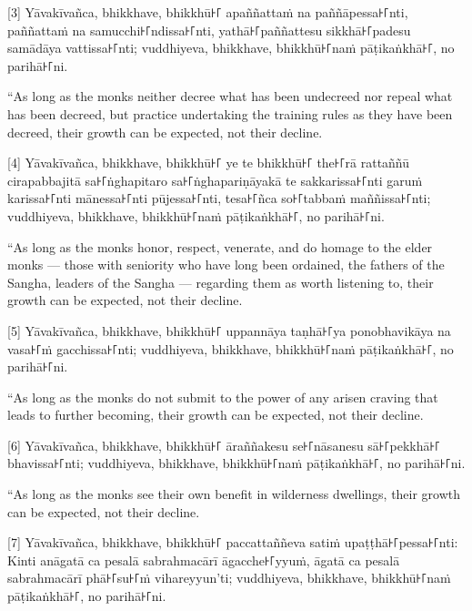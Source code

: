 \documentclass[
  babelLanguage=portuguese,
  final,
  a4Paper,
]{chantingbook}
\begin{document}
[3] Yāvakīvañca, bhikkhave, bhikkhū꜔꜒ apaññattaṁ na paññāpessa꜔꜒nti, paññattaṁ na
samucchi꜔꜒ndissa꜔꜒nti, yathā꜔꜒paññattesu sikkhā꜔꜒padesu samādāya vattissa꜔꜒nti;
vuddhiyeva, bhikkhave, bhikkhū꜔꜒naṁ pāṭikaṅkhā꜔꜒, no parihā꜔꜒ni.

\begin{english}
  “As long as the monks neither decree what has been undecreed nor repeal what
  has been decreed, but practice undertaking the training rules as they have
  been decreed, their growth can be expected, not their decline.
\end{english}

[4] Yāvakīvañca, bhikkhave, bhikkhū꜔꜒ ye te bhikkhū꜔꜒ the꜔꜒rā rattaññū cirapabbajitā
sa꜔꜒ṅghapitaro sa꜔꜒ṅghapariṇāyakā te sakkarissa꜔꜒nti garuṁ karissa꜔꜒nti mānessa꜔꜒nti
pūjessa꜔꜒nti, tesa꜔꜒ñca so꜔꜒tabbaṁ maññissa꜔꜒nti; vuddhiyeva, bhikkhave, bhikkhū꜔꜒naṁ
pāṭikaṅkhā꜔꜒, no parihā꜔꜒ni.

\begin{english}
  “As long as the monks honor, respect, venerate, and do homage to the elder
  monks — those with seniority who have long been ordained, the fathers of the
  Sangha, leaders of the Sangha — regarding them as worth listening to, their
  growth can be expected, not their decline.
\end{english}

[5] Yāvakīvañca, bhikkhave, bhikkhū꜔꜒ uppannāya taṇhā꜔꜒ya ponobhavikāya na vasa꜔꜒ṁ
gacchissa꜔꜒nti; vuddhiyeva, bhikkhave, bhikkhū꜔꜒naṁ pāṭikaṅkhā꜔꜒, no parihā꜔꜒ni.

\begin{english}
  “As long as the monks do not submit to the power of any arisen craving that
  leads to further becoming, their growth can be expected, not their decline.
\end{english}

[6] Yāvakīvañca, bhikkhave, bhikkhū꜔꜒ āraññakesu se꜔꜒nāsanesu sā꜔꜒pekkhā꜔꜒ bhavissa꜔꜒nti;
vuddhiyeva, bhikkhave, bhikkhū꜔꜒naṁ pāṭikaṅkhā꜔꜒, no parihā꜔꜒ni.

\begin{english}
  “As long as the monks see their own benefit in wilderness dwellings, their
  growth can be expected, not their decline.
\end{english}

[7] Yāvakīvañca, bhikkhave, bhikkhū꜔꜒ paccattaññeva satiṁ upaṭṭhā꜔꜒pessa꜔꜒nti: Kinti
anāgatā ca pesalā sabrahmacārī āgacche꜔꜒yyuṁ, āgatā ca pesalā sabrahmacārī phā꜔꜒su꜔꜒ṁ
vihareyyun'ti; vuddhiyeva, bhikkhave, bhikkhū꜔꜒naṁ pāṭikaṅkhā꜔꜒, no parihā꜔꜒ni.
\end{document}
